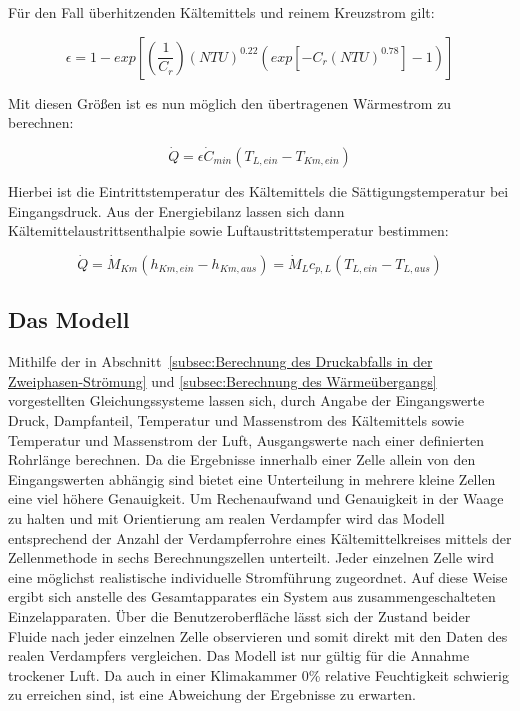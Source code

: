 Für den Fall überhitzenden Kältemittels und reinem Kreuzstrom gilt:

\begin{equation}
\label{eq:34}
\epsilon = 1- exp{\left[\left(\frac{1}{C_r}\right)(NTU)^{0.22}(exp{[-C_r(NTU)^{0.78}]}-1)\right]}
\end{equation}

Mit diesen Größen ist es nun möglich den übertragenen Wärmestrom zu berechnen:

\begin{equation}
\label{eq:35}
\dot{Q} = \epsilon \dot{C}_{min} (T_{L,ein} - T_{Km,ein})
\end{equation}

Hierbei ist die Eintrittstemperatur des Kältemittels die Sättigungstemperatur bei Eingangsdruck. Aus der Energiebilanz lassen sich dann Kältemittelaustrittsenthalpie sowie Luftaustrittstemperatur bestimmen:

\begin{equation}
\label{eq:36}
\dot{Q} = \dot{M}_{Km} (h_{Km,ein} - h_{Km,aus}) = \dot{M}_{L} c_{p,L}(T_{L,ein} - T_{L,aus})
\end{equation}





\subsection{Das Modell}
\label{subsec:Das Modell}

Mithilfe der in Abschnitt~\ref{subsec:Berechnung des Druckabfalls in der Zweiphasen-Strömung} und \ref{subsec:Berechnung des Wärmeübergangs} vorgestellten Gleichungssysteme lassen sich, durch Angabe der Eingangswerte Druck, Dampfanteil, Temperatur und Massenstrom des Kältemittels sowie Temperatur und Massenstrom der Luft, Ausgangswerte nach einer definierten Rohrlänge berechnen. Da die Ergebnisse innerhalb einer Zelle allein von den Eingangswerten abhängig sind bietet eine Unterteilung in mehrere kleine Zellen eine viel höhere Genauigkeit. Um Rechenaufwand und Genauigkeit in der Waage zu halten und mit Orientierung am realen Verdampfer wird das Modell entsprechend der Anzahl der Verdampferrohre eines Kältemittelkreises mittels der Zellenmethode in sechs Berechnungszellen unterteilt\cite{LehrstuhlfurWarmeundStoffubertragung.b}. Jeder einzelnen Zelle wird eine möglichst realistische individuelle Stromführung zugeordnet. Auf diese Weise ergibt sich anstelle des Gesamtapparates ein System aus zusammengeschalteten Einzelapparaten\cite{SpringerVerlagGmbH.2013}.
Über die Benutzeroberfläche lässt sich der Zustand beider Fluide nach jeder einzelnen Zelle observieren und somit direkt mit den Daten des realen Verdampfers vergleichen.
Das Modell ist nur gültig für die Annahme trockener Luft. Da auch in einer Klimakammer \unit{0}{\%} relative Feuchtigkeit schwierig zu erreichen sind, ist eine Abweichung der Ergebnisse zu erwarten.




